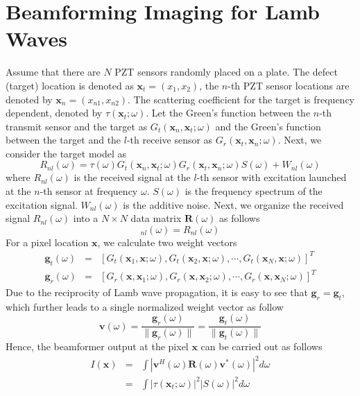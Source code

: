\documentclass{article}
\begin{document}
\section{Beamforming Imaging for Lamb Waves}
Assume that there are $N$ PZT sensors randomly placed on a plate. The defect (target) location is denoted as $\mathbf{x}_t = (x_1, x_2)$, the $n$-th PZT sensor locations are denoted by $\mathbf{x}_n = (x_{n1}, x_{n2})$. The scattering coefficient for the target is frequency dependent, denoted by $\tau(\mathbf{x}_t; \omega)$.
Let the Green's function between the $n$-th transmit sensor and the target as $G_t(\mathbf{x}_n, \mathbf{x}_t; \omega)$ and the Green's function between the target and the $l$-th receive sensor as $G_r(\mathbf{x}_t, \mathbf{x}_n; \omega)$. Next, we consider the target model as
\begin{equation}
R_{nl}(\omega) = \tau(\omega) G_t(\mathbf{x}_n, \mathbf{x}_t; \omega) G_r(\mathbf{x}_t, \mathbf{x}_n; \omega)S(\omega) + W_{nl}(\omega)
\end{equation}
where $R_{nl}(\omega)$ is the received signal at the $l$-th sensor with excitation launched at the $n$-th sensor at frequency $\omega$. $S(\omega)$ is the frequency spectrum of the excitation signal. $W_{nl}(\omega)$ is the additive noise. Next, we organize the received signal $R_{nl}(\omega)$ into a $N \times N$ data matrix $\mathbf{R}(\omega)$ as follows
\begin{equation}
[\mathbf{R}]_{nl}(\omega) = R_{nl}(\omega)
\end{equation}
For a pixel location $\mathbf{x}$, we calculate two weight vectors
\begin{eqnarray}
\mathbf{g}_t(\omega) &=& [G_t(\mathbf{x}_1, \mathbf{x}; \omega), G_t(\mathbf{x}_2, \mathbf{x}; \omega), \cdots, G_t(\mathbf{x}_N, \mathbf{x}; \omega)]^T \\
\mathbf{g}_r(\omega) &=& [G_r(\mathbf{x}, \mathbf{x}_1; \omega), G_r(\mathbf{x}, \mathbf{x}_2; \omega), \cdots, G_r(\mathbf{x}, \mathbf{x}_N; \omega)]^T
\end{eqnarray}
Due to the reciprocity of Lamb wave propagation, it is easy to see that $\mathbf{g}_r = \mathbf{g}_t$, which further leads to a single normalized weight vector as follow
\begin{equation}
\mathbf{v}(\omega) = \frac{\mathbf{g}_r(\omega)}{\|\mathbf{g}_r(\omega)\|}=  \frac{\mathbf{g}_t(\omega)}{\|\mathbf{g}_t(\omega)\|}
\end{equation}
Hence, the beamformer output at the pixel $\mathbf{x}$ can be carried out as follows
\begin{eqnarray}
I(\mathbf{x}) &=&  \int \left| \mathbf{v}^H(\omega) \mathbf{R}(\omega) \mathbf{v}^*(\omega) \right|^2 d \omega  \label{Ix1} \\
&=& \int \left| \tau(\mathbf{x}_t;  \omega)\right|^2  \left| S(\omega) \right|^2 d \omega  
\end{eqnarray}
\end{document}
